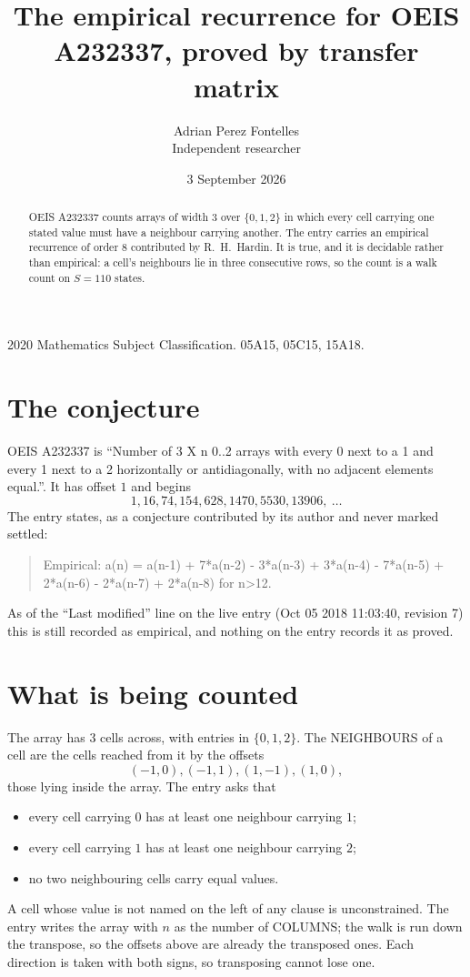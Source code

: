 \documentclass[11pt,a4paper]{article}
\title{The empirical recurrence for OEIS A232337, proved by transfer matrix}
\author{Adrian Perez Fontelles\\ \small Independent researcher}
\date{3 September 2026}
\theoremstyle{plain}
\theoremstyle{definition}
\begin{document}
\maketitle

\begin{abstract}
OEIS A232337 counts arrays of width $3$ over $\{0,1,2\}$ in which every cell carrying one stated
value must have a neighbour carrying another. The entry carries an empirical recurrence of
order $8$ contributed by R.~H.~Hardin. It is true, and it is decidable rather than
empirical: a cell's neighbours lie in three consecutive rows, so the count is a walk count on
$S=110$ states.
\end{abstract}

\noindent\small 2020 Mathematics Subject Classification. 05A15, 05C15, 15A18.\normalsize

\section{The conjecture}

OEIS A232337 is ``Number of 3 X n 0..2 arrays with every 0 next to a 1 and every 1 next to a 2 horizontally or antidiagonally, with no adjacent elements equal.''. It has offset $1$ and begins
\[
1, 16, 74, 154, 628, 1470, 5530, 13906,\ \dots
\]
The entry states, as a conjecture contributed by its author and never marked settled:
\begin{quote}
Empirical: a(n) = a(n-1) + 7*a(n-2) - 3*a(n-3) + 3*a(n-4) - 7*a(n-5) + 2*a(n-6) - 2*a(n-7) + 2*a(n-8) for n>12.
\end{quote}
As of the ``Last modified'' line on the live entry (Oct 05 2018 11:03:40, revision 7) this is still
recorded as empirical, and nothing on the entry records it as proved.

\section{What is being counted}

The array has $3$ cells across, with entries in $\{0,1,2\}$. The NEIGHBOURS of a cell are the
cells reached from it by the offsets
\[
(-1,0), (-1,1), (1,-1), (1,0),
\]
those lying inside the array. The entry asks that
\begin{itemize}
\item every cell carrying $0$ has at least one neighbour carrying $1$;
\item every cell carrying $1$ has at least one neighbour carrying $2$;
\item no two neighbouring cells carry equal values.
\end{itemize}
A cell whose value is not named on the left of any clause is unconstrained. The entry writes the array with $n$ as the number of COLUMNS; the walk is run down the transpose, so the offsets above are already the transposed ones. Each direction is taken with both signs, so transposing cannot lose one.
\end{document}
